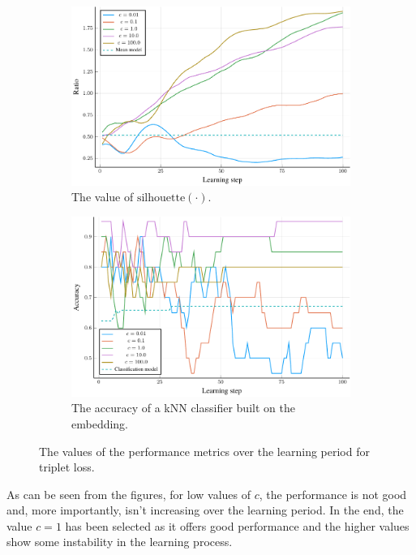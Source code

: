 \begin{figure}[h]
  \centering
  \begin{subfigure}[t]{0.49\textwidth}
    \centering
    \includegraphics[width=\textwidth]{images/triplet-gridsearch/ratio/triplet-gridsearch-ratio.pdf}
    \caption{The value of \( \mathrm{silhouette} \left( \cdot \right) \).}
  \end{subfigure}
  \hfill
  \begin{subfigure}[t]{0.49\textwidth}
    \centering
    \includegraphics[width=\textwidth]{images/triplet-gridsearch/accuracy/triplet-gridsearch-accuracy.pdf}
    \caption{The accuracy of a kNN classifier built on the embedding.}
  \end{subfigure}
  \caption{The values of the performance metrics over the learning period for triplet loss.}\label{fig:triplet-gridsearch}
\end{figure}

As can be seen from the figures, for low values of \( c \), the performance is not good and, more importantly, isn't increasing over the learning period. In the end, the value \( c = 1 \) has been selected as it offers good performance and the higher values show some instability in the learning process.

